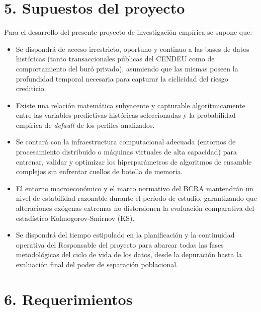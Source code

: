\documentclass[
11pt, %
]{charter}
\begin{document}
\section{5. Supuestos del proyecto}
\label{sec:supuestos}

Para el desarrollo del presente proyecto de investigación empírica se supone que:
\begin{itemize}
\item Se dispondrá de acceso irrestricto, oportuno y continuo a las bases de datos históricas (tanto transaccionales públicas del CENDEU como de comportamiento del buró privado), asumiendo que las mismas poseen la profundidad temporal necesaria para capturar la ciclicidad del riesgo crediticio.
\item Existe una relación matemática subyacente y capturable algorítmicamente entre las variables predictivas históricas seleccionadas y la probabilidad empírica de \textit{default} de los perfiles analizados.
\item Se contará con la infraestructura computacional adecuada (entornos de procesamiento distribuido o máquinas virtuales de alta capacidad) para entrenar, validar y optimizar los hiperparámetros de algoritmos de ensamble complejos sin enfrentar cuellos de botella de memoria.
\item El entorno macroeconómico y el marco normativo del BCRA mantendrán un nivel de estabilidad razonable durante el período de estudio, garantizando que alteraciones exógenas extremas no distorsionen la evaluación comparativa del estadístico Kolmogorov-Smirnov (KS).
\item Se dispondrá del tiempo estipulado en la planificación y la continuidad operativa del Responsable del proyecto para abarcar todas las fases metodológicas del ciclo de vida de los datos, desde la depuración hasta la evaluación final del poder de separación poblacional.
\end{itemize}

\section{6. Requerimientos}
\label{sec:requerimientos}
\end{document}
